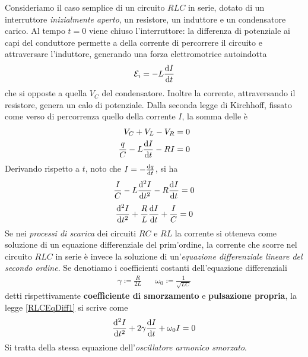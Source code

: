 Consideriamo il caso semplice di un circuito $RLC$ in serie, dotato di un interruttore \textit{inizialmente aperto}, un resistore, un induttore e un condensatore carico. Al tempo $t=0$ viene chiuso l'interruttore: la differenza di potenziale ai capi del conduttore permette a della corrente di percorrere il circuito e attraversare l'induttore, generando una forza elettromotrice autoindotta
\begin{equation*}
	\mathcal{E}_i=-L\dv{I}{t}
\end{equation*}
che si opposte a quella $V_C$ del condensatore. Inoltre la corrente, attraversando il resistore, genera un calo di potenziale. Dalla seconda legge di Kirchhoff, fissato come verso di percorrenza quello della corrente $I$, la somma delle \ddp è
\begin{align*}
	V_C+V_L-V_R=0\\
	\frac{q}{C}-L\dv{I}{t}-RI=0
\end{align*}
Derivando rispetto a $t$, noto che $I=-\dv{q}{t}$, si ha
\begin{equation*}
	\frac{I}{C}-L\dv[2]{I}{t}-R\dv{I}{t}=0
\end{equation*}
\begin{equation*}
	\dv[2]{I}{t}+\frac{R}{L}\dv{I}{t}+\frac{I}{C}=0\label{RLCEqDiff1}
\end{equation*}
Se nei \textit{processi di scarica} dei circuiti $RC$ e $RL$ la corrente si otteneva come soluzione di un equazione differenziale del prim'ordine, la corrente che scorre nel circuito $RLC$ in serie è invece la soluzione di un'\textit{equazione differenziale lineare del secondo ordine}. Se denotiamo i coefficienti costanti dell'equazione differenziali
\begin{align}
	\gamma\coloneqq\frac{R}{2L}&&\omega_0\coloneqq\frac{1}{\sqrt{LC}}
\end{align}
detti rispettivamente \textbf{coefficiente di smorzamento} e \textbf{pulsazione propria}, la legge \eqref{RLCEqDiff1} si scrive come
\begin{equation}
	\dv[2]{I}{t}+2\gamma\dv{I}{t}+\omega_0I=0\label{RLCEqDiff2}
\end{equation}
Si tratta della stessa equazione dell'\textit{oscillatore armonico smorzato}.
